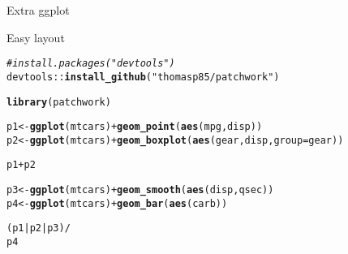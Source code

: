 \documentclass[10pt]{beamer}\usepackage[]{graphicx}\usepackage[]{color}
\makeatletter
\newcommand{\hlstr}[1]{\textcolor[rgb]{0.192,0.494,0.8}{#1}}%
\newcommand{\hlcom}[1]{\textcolor[rgb]{0.678,0.584,0.686}{\textit{#1}}}%
\newcommand{\hlopt}[1]{\textcolor[rgb]{0,0,0}{#1}}%
\newcommand{\hlstd}[1]{\textcolor[rgb]{0.345,0.345,0.345}{#1}}%
\newcommand{\hlkwb}[1]{\textcolor[rgb]{0.69,0.353,0.396}{#1}}%
\newcommand{\hlkwc}[1]{\textcolor[rgb]{0.333,0.667,0.333}{#1}}%
\newcommand{\hlkwd}[1]{\textcolor[rgb]{0.737,0.353,0.396}{\textbf{#1}}}%
\newenvironment{kframe}{%
 \def\at@end@of@kframe{}%
 \ifinner\ifhmode%
  \def\at@end@of@kframe{\end{minipage}}%
  \begin{minipage}{\columnwidth}%
 \fi\fi%
 \def\FrameCommand##1{\hskip\@totalleftmargin \hskip-\fboxsep
 \colorbox{shadecolor}{##1}\hskip-\fboxsep
     \hskip-\linewidth \hskip-\@totalleftmargin \hskip\columnwidth}%
 \MakeFramed {\advance\hsize-\width
   \@totalleftmargin\z@ \linewidth\hsize
   \@setminipage}}%
 {\par\unskip\endMakeFramed%
 \at@end@of@kframe}
\newenvironment{knitrout}{}{} %
\makeatother
\begin{document}
\begin{frame}[fragile]{Extra ggplot}

Easy layout

\begin{knitrout}
\color{fgcolor}\begin{kframe}
\begin{alltt}
\hlcom{# install.packages("devtools")}
\hlstd{devtools}\hlopt{::}\hlkwd{install_github}\hlstd{(}\hlstr{"thomasp85/patchwork"}\hlstd{)}

\hlkwd{library}\hlstd{(patchwork)}

\hlstd{p1} \hlkwb{<-} \hlkwd{ggplot}\hlstd{(mtcars)} \hlopt{+} \hlkwd{geom_point}\hlstd{(}\hlkwd{aes}\hlstd{(mpg, disp))}
\hlstd{p2} \hlkwb{<-} \hlkwd{ggplot}\hlstd{(mtcars)} \hlopt{+} \hlkwd{geom_boxplot}\hlstd{(}\hlkwd{aes}\hlstd{(gear, disp,} \hlkwc{group} \hlstd{= gear))}

\hlstd{p1} \hlopt{+} \hlstd{p2}

\hlstd{p3} \hlkwb{<-} \hlkwd{ggplot}\hlstd{(mtcars)} \hlopt{+} \hlkwd{geom_smooth}\hlstd{(}\hlkwd{aes}\hlstd{(disp, qsec))}
\hlstd{p4} \hlkwb{<-} \hlkwd{ggplot}\hlstd{(mtcars)} \hlopt{+} \hlkwd{geom_bar}\hlstd{(}\hlkwd{aes}\hlstd{(carb))}

\hlstd{(p1} \hlopt{|} \hlstd{p2} \hlopt{|} \hlstd{p3)} \hlopt{/}
      \hlstd{p4}
\end{alltt}
\end{kframe}
\end{knitrout}


\end{frame}
\end{document}
